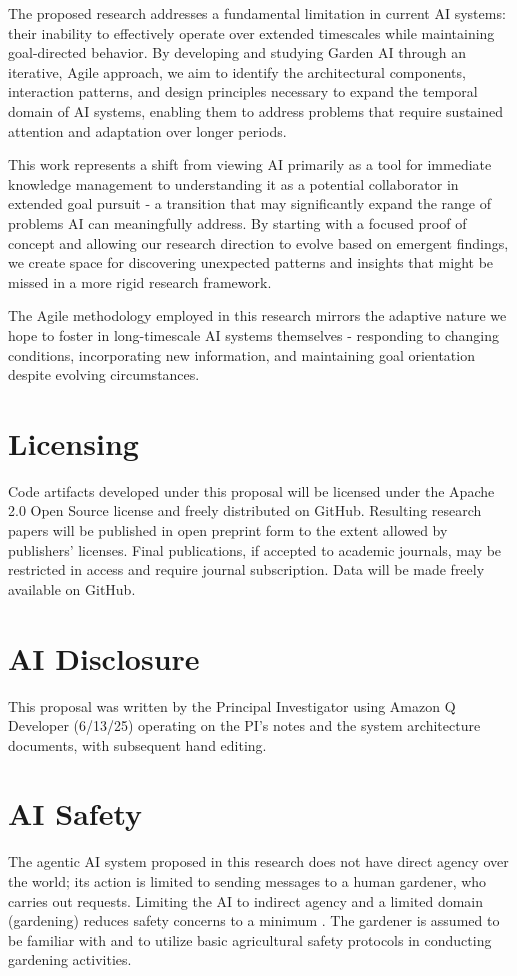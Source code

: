 \documentclass[12pt,letterpaper]{article}
\begin{document}
The proposed research addresses a fundamental limitation in current AI systems: their inability to effectively operate over extended timescales while maintaining goal-directed behavior. By developing and studying Garden AI through an iterative, Agile approach, we aim to identify the architectural components, interaction patterns, and design principles necessary to expand the temporal domain of AI systems, enabling them to address problems that require sustained attention and adaptation over longer periods.

This work represents a shift from viewing AI primarily as a tool for immediate knowledge management to understanding it as a potential collaborator in extended goal pursuit - a transition that may significantly expand the range of problems AI can meaningfully address. By starting with a focused proof of concept and allowing our research direction to evolve based on emergent findings, we create space for discovering unexpected patterns and insights that might be missed in a more rigid research framework.

The Agile methodology employed in this research mirrors the adaptive nature we hope to foster in long-timescale AI systems themselves - responding to changing conditions, incorporating new information, and maintaining goal orientation despite evolving circumstances.

\section{Licensing}

Code artifacts developed under this proposal will be licensed under the Apache 2.0 Open Source license and freely distributed on GitHub. Resulting research papers will be published in open preprint form to the extent allowed by publishers' licenses. Final publications, if accepted to academic journals, may be restricted in access and require journal subscription. Data will be made freely available on GitHub.

\section{AI Disclosure}

This proposal was written by the Principal Investigator using Amazon Q Developer (6/13/25) operating on the PI's notes and the system architecture documents, with subsequent hand editing.

\section{AI Safety}

The agentic AI system proposed in this research does not have direct agency over the world; its action is limited to sending messages to a human gardener, who carries out requests. Limiting the AI to indirect agency and a limited domain (gardening) reduces safety concerns to a minimum \cite{osogami2025}. The gardener is assumed to be familiar with and to utilize basic agricultural safety protocols in conducting gardening activities.



\end{document}
